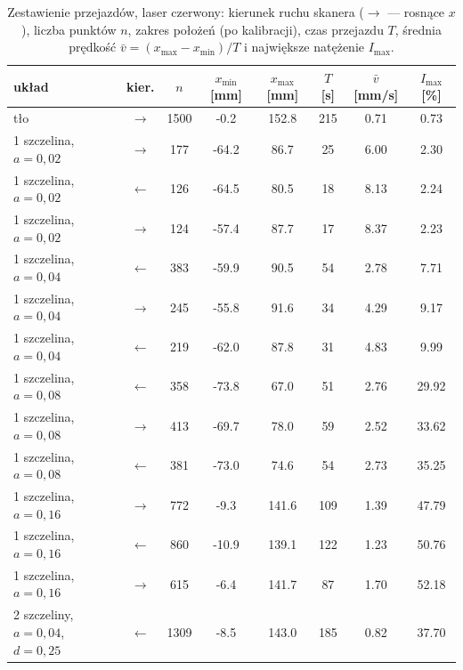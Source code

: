 \documentclass[12pt, a4paper]{article}
\begin{document}
\begin{table}[H]
    \centering
    \caption{Zestawienie przejazdów, laser czerwony: kierunek ruchu skanera ($\rightarrow$ --- rosnące $x$),
             liczba punktów $n$, zakres położeń (po kalibracji), czas przejazdu $T$, średnia prędkość
             $\bar v = (x_\text{max} - x_\text{min})/T$ i największe natężenie $I_\text{max}$.}
    \label{tab:scans_red}
    \footnotesize
    \begin{tabular}{l c S[table-format=4.0] S[table-format=-3.1] S[table-format=-3.1]
                    S[table-format=3.0] S[table-format=1.2] S[table-format=2.2]}
        \toprule
        układ & kier. & {$n$} & {$x_\text{min}$ [mm]} & {$x_\text{max}$ [mm]} & {$T$ [s]}
              & {$\bar v$ [mm/s]} & {$I_\text{max}$ [\%]} \\
        \midrule
        tło & $\rightarrow$ & 1500 & -0.2 & 152.8 & 215 & 0.71 & 0.73 \\
        1 szczelina, $a = 0{,}02$ & $\rightarrow$ & 177 & -64.2 & 86.7 & 25 & 6.00 & 2.30 \\
        1 szczelina, $a = 0{,}02$ & $\leftarrow$ & 126 & -64.5 & 80.5 & 18 & 8.13 & 2.24 \\
        1 szczelina, $a = 0{,}02$ & $\rightarrow$ & 124 & -57.4 & 87.7 & 17 & 8.37 & 2.23 \\
        1 szczelina, $a = 0{,}04$ & $\leftarrow$ & 383 & -59.9 & 90.5 & 54 & 2.78 & 7.71 \\
        1 szczelina, $a = 0{,}04$ & $\rightarrow$ & 245 & -55.8 & 91.6 & 34 & 4.29 & 9.17 \\
        1 szczelina, $a = 0{,}04$ & $\leftarrow$ & 219 & -62.0 & 87.8 & 31 & 4.83 & 9.99 \\
        1 szczelina, $a = 0{,}08$ & $\leftarrow$ & 358 & -73.8 & 67.0 & 51 & 2.76 & 29.92 \\
        1 szczelina, $a = 0{,}08$ & $\rightarrow$ & 413 & -69.7 & 78.0 & 59 & 2.52 & 33.62 \\
        1 szczelina, $a = 0{,}08$ & $\leftarrow$ & 381 & -73.0 & 74.6 & 54 & 2.73 & 35.25 \\
        1 szczelina, $a = 0{,}16$ & $\rightarrow$ & 772 & -9.3 & 141.6 & 109 & 1.39 & 47.79 \\
        1 szczelina, $a = 0{,}16$ & $\leftarrow$ & 860 & -10.9 & 139.1 & 122 & 1.23 & 50.76 \\
        1 szczelina, $a = 0{,}16$ & $\rightarrow$ & 615 & -6.4 & 141.7 & 87 & 1.70 & 52.18 \\
        2 szczeliny, $a = 0{,}04$, $d = 0{,}25$ & $\leftarrow$ & 1309 & -8.5 & 143.0 & 185 & 0.82 & 37.70 \\

\end{tabular}
\end{table}
\end{document}
